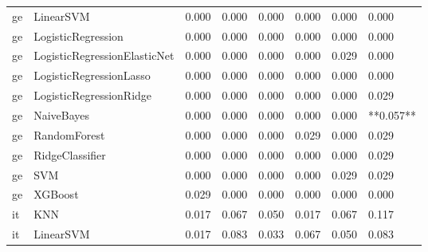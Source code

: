 \begin{tabular}{llllllll}
      ge &                    LinearSVM & 0.000 &                     0.000 &                 0.000 &                  0.000 &                                   0.000 &     0.000 \\
      ge &           LogisticRegression & 0.000 &                     0.000 &                 0.000 &                  0.000 &                                   0.000 &     0.000 \\
      ge & LogisticRegressionElasticNet & 0.000 &                     0.000 &                 0.000 &                  0.000 &                                   0.029 &     0.000 \\
      ge &      LogisticRegressionLasso & 0.000 &                     0.000 &                 0.000 &                  0.000 &                                   0.000 &     0.000 \\
      ge &      LogisticRegressionRidge & 0.000 &                     0.000 &                 0.000 &                  0.000 &                                   0.000 &     0.029 \\
      ge &                   NaiveBayes & 0.000 &                     0.000 &                 0.000 &                  0.000 &                                   0.000 & **0.057** \\
      ge &                 RandomForest & 0.000 &                     0.000 &                 0.000 &                  0.029 &                                   0.000 &     0.029 \\
      ge &              RidgeClassifier & 0.000 &                     0.000 &                 0.000 &                  0.000 &                                   0.000 &     0.029 \\
      ge &                          SVM & 0.000 &                     0.000 &                 0.000 &                  0.000 &                                   0.029 &     0.029 \\
      ge &                      XGBoost & 0.029 &                     0.000 &                 0.000 &                  0.000 &                                   0.000 &     0.000 \\
      it &                          KNN & 0.017 &                     0.067 &                 0.050 &                  0.017 &                                   0.067 &     0.117 \\
      it &                    LinearSVM & 0.017 &                     0.083 &                 0.033 &                  0.067 &                                   0.050 &     0.083 \\

\end{tabular}
